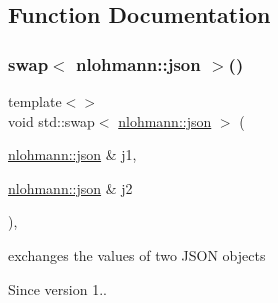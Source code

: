 \subsection{Function Documentation}
\mbox{\label{namespacestd_ace192546038d61d9c28ddfe0c3d732de}} 
\subsubsection{\texorpdfstring{swap$<$ nlohmann::json $>$()}{swap< nlohmann::json >()}}
{\footnotesize\ttfamily template$<$$>$ \\
void std\+::swap$<$ \mbox{\hyperlink{namespacenlohmann_a2bfd99e845a2e5cd90aeaf1b1431f474}{nlohmann\+::json}} $>$ (\begin{DoxyParamCaption}\item[{\mbox{\hyperlink{namespacenlohmann_a2bfd99e845a2e5cd90aeaf1b1431f474}{nlohmann\+::json}} \&}]{j1,  }\item[{\mbox{\hyperlink{namespacenlohmann_a2bfd99e845a2e5cd90aeaf1b1431f474}{nlohmann\+::json}} \&}]{j2 }\end{DoxyParamCaption})\hspace{0.3cm}{\ttfamily [inline]}, {\ttfamily [noexcept]}}



exchanges the values of two J\+S\+ON objects 

\begin{DoxySince}{Since}
version 1.. 
\end{DoxySince}
